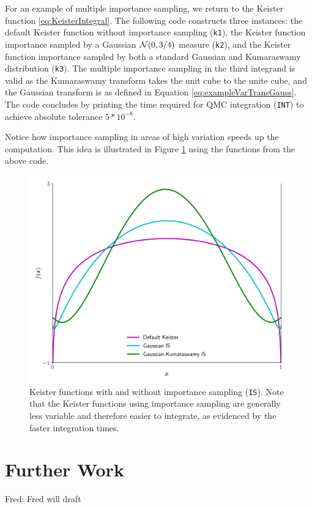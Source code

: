 \documentclass[graybox,footinfo]{svmult}
\newcommand{\FJHComment}[1]{{\color{magenta} Fred: #1}}
\begin{document}
For an example of multiple importance sampling, we return to the Keister function \eqref{eq:KeisterIntegral}. The following code constructs three instances: the default Keister function without importance sampling (\texttt{k1}), the Keister function importance sampled by a Gaussian ${\mathcal{N}}(0,3/4)$ measure (\texttt{k2}), and the Keister function importance sampled by both a standard Gaussian and Kumaraswamy distribution (\texttt{k3}). The multiple importance sampling in the third integrand is valid as the Kumaraswamy transform takes the unit cube to the unite cube, and the Gaussian transform is as defined in Equation \ref{eq:exampleVarTransGauss}. The code concludes by printing the time required for QMC integration (\texttt{INT}) to achieve absolute tolerance $5*10^{-8}$.

Notice how importance sampling in areas of high variation speeds up the computation. This idea is illustrated in Figure \ref{fig:mIS} using the functions from the above code. 
\begin{figure}
    \centering
	\includegraphics[width=.8\textwidth]{QMCSoftwareArticle/figs/multiple_IS.png}
	\caption{Keister functions with and without importance sampling (\texttt{IS}). Note that the Keister functions using importance sampling are generally less variable and therefore easier to integrate, as evidenced by the faster integration times.} \label{fig:mIS}
\end{figure}

\section{Further Work} \label{sec:further} \FJHComment{Fred will draft}
\end{document}
